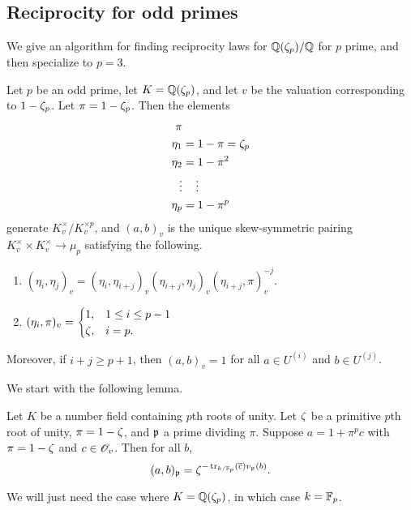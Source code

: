 \subsection{Reciprocity for odd primes}
We give an algorithm for finding reciprocity laws for $\mathbb{Q}(\zeta_p)/\mathbb{Q}$ for $p$ prime, and then specialize to $p=3$.
\begin{thm}
Let $p$ be an odd prime, let $K=\mathbb{Q}(\zeta_p)$, and let $v$ be the valuation corresponding to $1-\zeta_p$. Let $\pi=1-\zeta_p$. Then the elements
\begin{align*}
\pi&\\
\eta_1&=1-\pi=\zeta_p\\
\eta_2&=1-\pi^2\\
\vdots & \quad \vdots\\
\eta_p&=1-\pi^p
\end{align*}
generate $K_v^{\times}/K_v^{\times p}$, and $(a,b)_v$ is the unique skew-symmetric pairing $K_v^{\times}\times K_v^{\times}\to \mu_p$ satisfying the following.
\begin{enumerate}
\item $(\eta_i,\eta_j)_v=(\eta_i,\eta_{i+j})_v(\eta_{i+j},\eta_j)_v (\eta_{i+j},\pi)_v^{-j}$.
\item $(\eta_i,\pi)_v=\begin{cases}
1,&1\le i\le p-1\\
\zeta,&i=p.
\end{cases}$
\end{enumerate}
Moreover, if $i+j\ge p+1$, then $(a,b)_v=1$ for all $a\in U^{(i)}$ and $b\in U^{(j)}$.
\end{thm}
We start with the following lemma.
\begin{lem}
Let $K$ be a number field containing $p$th roots of unity. Let $\zeta$ be a primitive $p$th root of unity, $\pi=1-\zeta$, and $\mathfrak{p}$ a prime dividing $\pi$. 
Suppose $a=1+\pi^pc$ with $\pi=1-\zeta$ and $c\in \mathscr{O}_v$. Then for all $b$,
\[
(a,b)_{\mathfrak{p}}=\zeta^{-\operatorname{tr}_{k/\mathbb{F}_p}(\overline{c})v_{\mathfrak{p}}(b)}.
\]
\end{lem}
We will just need the case where $K=\mathbb{Q}(\zeta_p)$, in which case $k=\mathbb{F}_p$.
